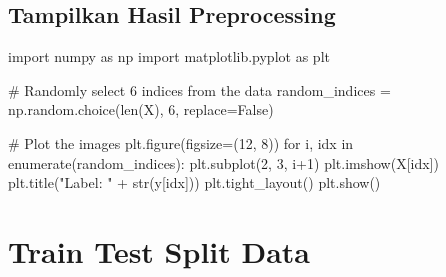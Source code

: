 \documentclass[
  letterpaper,
  DIV=11,
  numbers=noendperiod]{scrreprt}
\newenvironment{Shaded}{\begin{snugshade}}{\end{snugshade}}
\newcommand{\BuiltInTok}[1]{\textcolor[rgb]{0.00,0.23,0.31}{#1}}
\newcommand{\CommentTok}[1]{\textcolor[rgb]{0.37,0.37,0.37}{#1}}
\newcommand{\ControlFlowTok}[1]{\textcolor[rgb]{0.00,0.23,0.31}{#1}}
\newcommand{\DecValTok}[1]{\textcolor[rgb]{0.68,0.00,0.00}{#1}}
\newcommand{\ImportTok}[1]{\textcolor[rgb]{0.00,0.46,0.62}{#1}}
\newcommand{\KeywordTok}[1]{\textcolor[rgb]{0.00,0.23,0.31}{#1}}
\newcommand{\NormalTok}[1]{\textcolor[rgb]{0.00,0.23,0.31}{#1}}
\newcommand{\OperatorTok}[1]{\textcolor[rgb]{0.37,0.37,0.37}{#1}}
\newcommand{\StringTok}[1]{\textcolor[rgb]{0.13,0.47,0.30}{#1}}
\newcommand{\VariableTok}[1]{\textcolor[rgb]{0.07,0.07,0.07}{#1}}
\begin{document}
\hypertarget{tampilkan-hasil-preprocessing}{%
\subsection*{Tampilkan Hasil
Preprocessing}\label{tampilkan-hasil-preprocessing}}

\begin{Shaded}
\begin{Highlighting}[]
\ImportTok{import}\NormalTok{ numpy }\ImportTok{as}\NormalTok{ np}
\ImportTok{import}\NormalTok{ matplotlib.pyplot }\ImportTok{as}\NormalTok{ plt}

\CommentTok{\# Randomly select 6 indices from the data}
\NormalTok{random\_indices }\OperatorTok{=}\NormalTok{ np.random.choice(}\BuiltInTok{len}\NormalTok{(X), }\DecValTok{6}\NormalTok{, replace}\OperatorTok{=}\VariableTok{False}\NormalTok{)}

\CommentTok{\# Plot the images}
\NormalTok{plt.figure(figsize}\OperatorTok{=}\NormalTok{(}\DecValTok{12}\NormalTok{, }\DecValTok{8}\NormalTok{))}
\ControlFlowTok{for}\NormalTok{ i, idx }\KeywordTok{in} \BuiltInTok{enumerate}\NormalTok{(random\_indices):}
\NormalTok{    plt.subplot(}\DecValTok{2}\NormalTok{, }\DecValTok{3}\NormalTok{, i}\OperatorTok{+}\DecValTok{1}\NormalTok{)}
\NormalTok{    plt.imshow(X[idx])}
\NormalTok{    plt.title(}\StringTok{"Label: "} \OperatorTok{+} \BuiltInTok{str}\NormalTok{(y[idx]))}
\NormalTok{plt.tight\_layout()}
\NormalTok{plt.show()}
\end{Highlighting}
\end{Shaded}

\hypertarget{train-test-split-data-4}{%
\section*{Train Test Split Data}\label{train-test-split-data-4}}

\end{document}
